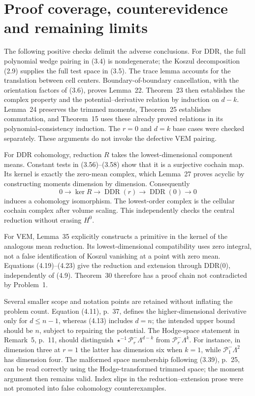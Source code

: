 \documentclass[10pt]{article}
\begin{document}
\section*{Proof coverage, counterevidence and remaining limits}
The following positive checks delimit the adverse conclusions. For DDR, the full polynomial wedge pairing in (3.4) is nondegenerate; the Koszul decomposition (2.9) supplies the full test space in (3.5). The trace lemma accounts for the translation between cell centers. Boundary-of-boundary cancellation, with the orientation factors of (3.6), proves Lemma 22. Theorem 23 then establishes the complex property and the potential–derivative relation by induction on \(d-k\). Lemma 24 preserves the trimmed moments, Theorem 25 establishes commutation, and Theorem 15 uses these already proved relations in its polynomial-consistency induction. The \(r=0\) and \(d=k\) base cases were checked separately. These arguments do not invoke the defective VEM pairing.\par
For DDR cohomology, reduction \(R\) takes the lowest-dimensional component means. Constant tests in (3.56)–(3.58) show that it is a surjective cochain map. Its kernel is exactly the zero-mean complex, which Lemma 27 proves acyclic by constructing moments dimension by dimension. Consequently \[0\longrightarrow\ker R\longrightarrow\operatorname{DDR}(r)
   \longrightarrow\operatorname{DDR}(0)\longrightarrow0\] induces a cohomology isomorphism. The lowest-order complex is the cellular cochain complex after volume scaling. This independently checks the central reduction without erasing \(H^0\).\par
For VEM, Lemma 35 explicitly constructs a primitive in the kernel of the analogous mean reduction. Its lowest-dimensional compatibility uses zero integral, not a false identification of Koszul vanishing at a point with zero mean. Equations (4.19)–(4.23) give the reduction and extension through DDR(0), independently of (4.9). Theorem 30 therefore has a proof chain not contradicted by Problem 1.\par
Several smaller scope and notation points are retained without inflating the problem count. Equation (4.11), p. 37, defines the higher-dimensional derivative only for \(d\le n-1\), whereas (4.13) includes \(d=n\); the intended upper bound should be \(n\), subject to repairing the potential. The Hodge-space statement in Remark 5, p. 11, should distinguish \(\star^{-1}\mathcal P_r^-\Lambda^{d-k}\) from \(\mathcal P_r^-\Lambda^k\). For instance, in dimension three at \(r=1\) the latter has dimension six when \(k=1\), while \(\mathcal P_1^-\Lambda^2\) has dimension four. The malformed space membership following (3.39), p. 25, can be read correctly using the Hodge-transformed trimmed space; the moment argument then remains valid. Index slips in the reduction–extension prose were not promoted into false cohomology counterexamples.\par
\end{document}
